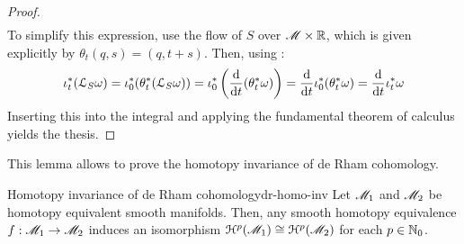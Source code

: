 \begin{proofbox}
\begin{proof}
\begin{equation*}
\begin{split}
      \end{split}
    \end{equation*}
    To simplify this expression, use the flow of $ S $ over $ \mathscr{M} \times \mathbb{R} $, which is given explicitly by $ \theta_t(q,s) = (q , t+s) $. Then, using :
    \begin{equation*}
      \iota_t^* (\EuScript{L}_S \omega) = \iota_0^* (\theta_t^* (\EuScript{L}_S \omega)) = \iota_0^* \left( \frac{\mathrm{d}}{\mathrm{d} t} (\theta_t^* \omega) \right) = \frac{\mathrm{d}}{\mathrm{d} t} \iota_0^* (\theta_t^* \omega) = \frac{\mathrm{d}}{\mathrm{d} t} \iota_t^* \omega
    \end{equation*}
    Inserting this into the integral and applying the fundamental theorem of calculus yields the thesis.
  \end{proof}
\end{proofbox}

This lemma allows to prove the homotopy invariance of de Rham cohomology.

\begin{theorem}{Homotopy invariance of de Rham cohomology}{dr-homo-inv}
  Let $ \mathscr{M}_1 $ and $ \mathscr{M}_2 $ be homotopy equivalent smooth manifolds. Then, any smooth homotopy equivalence $ f : \mathscr{M}_1 \rightarrow \mathscr{M}_2 $ induces an isomorphism $ \EuScript{H}^{p}(\mathscr{M}_1) \cong \EuScript{H}^{p}(\mathscr{M}_2) $ for each $ p \in \mathbb{N}_0 $.
\end{theorem}

